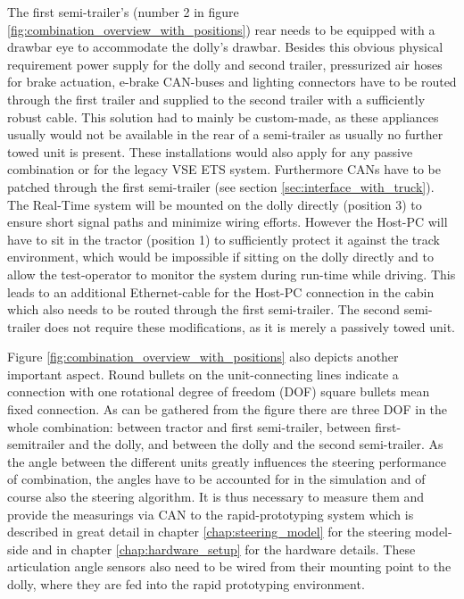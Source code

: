 \documentclass[ExampleMasters.tex]{subfiles}
\begin{document}
The first semi-trailer's (number 2 in figure \ref{fig:combination_overview_with_positions}) rear needs to be equipped with a drawbar eye to accommodate the dolly's drawbar. Besides this obvious physical requirement power supply for the dolly and second trailer, pressurized air hoses for brake actuation, e-brake CAN-buses and lighting connectors have to be routed through the first trailer and supplied to the second trailer with a sufficiently robust cable. This solution had to mainly be custom-made, as these appliances usually would not be available in the rear of a semi-trailer as usually no further towed unit is present. These installations would also apply for any passive combination or for the legacy \gls{VSE} \gls{ETS} system. Furthermore \gls{CAN}s have to be patched through the first semi-trailer (see section \ref{sec:interface_with_truck}). The Real-Time system will be mounted on the dolly directly (position 3) to ensure short signal paths and minimize wiring efforts. However the Host-PC will have to sit in the tractor (position 1) to sufficiently protect it against the track environment, which would be impossible if sitting on the dolly directly and to allow the test-operator to monitor the system during run-time while driving. This leads to an additional Ethernet-cable for the Host-PC connection in the cabin which also needs to be routed through the first semi-trailer. The second semi-trailer does not require these modifications, as it is merely a passively towed unit.

Figure \ref{fig:combination_overview_with_positions} also depicts another important aspect. Round bullets on the unit-connecting lines indicate a connection with one rotational degree of freedom (DOF) square bullets mean fixed connection. As can be gathered from the figure there are three DOF in the whole combination: between tractor and first semi-trailer, between first-semitrailer and the dolly, and between the dolly and the second semi-trailer. As the angle between the different units greatly influences the steering performance of combination, the angles have to be accounted for in the simulation and of course also the steering algorithm. It is thus necessary to measure them and provide the measurings via \gls{CAN} to the rapid-prototyping system which is described in great detail in chapter \ref{chap:steering_model} for the steering model-side and in chapter \ref{chap:hardware_setup} for the hardware details. These articulation angle sensors also need to be wired from their mounting point to the dolly, where they are fed into the rapid prototyping environment. 
\end{document}
